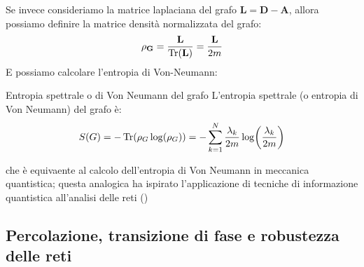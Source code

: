 Se invece consideriamo la matrice laplaciana del grafo $\mathbf{L}=\mathbf{D}-\mathbf{A}$, allora possiamo definire la matrice densità normalizzata del grafo:
\begin{equation}
    \mathbf{\rho_G}=\frac{\mathbf{L}}{\Tr(\mathbf{L})}=\frac{\mathbf{L}}{2m}
\end{equation}
E possiamo calcolare l'entropia di Von-Neumann:
\begin{boxb}{Entropia spettrale o di Von Neumann del grafo}
    L'entropia spettrale (o entropia di Von Neumann) del grafo è:
    \begin{equation}
        S(G)=-\Tr(\rho_G\log(\rho_G))=-\sum_{k=1}^{N}\frac{\lambda_k}{2m}\log(\frac{\lambda_k}{2m})
    \end{equation}
\end{boxb}
che è equivaente al calcolo dell'entropia di Von Neumann in meccanica quantistica; questa analogica ha ispirato l'applicazione di tecniche di informazione quantistica all'analisi delle reti (\cite{Passerini:2008:vonNeumann})

\subsection{Percolazione, transizione di fase e robustezza delle reti}

